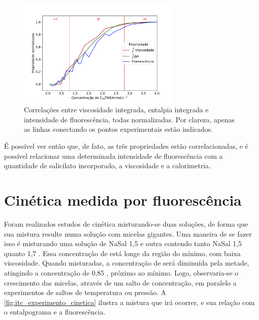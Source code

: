 	\begin{figure}[h]
		\centering
		\includegraphics[width=0.7\textwidth]{imagens/fluor/correlacoes_propriedades_zoom}
		\caption{Correlações entre viscosidade integrada, entalpia integrada e intensidade de fluorescência, todas normalizadas. Por clareza, apenas as linhas conectando os pontos experimentais estão indicados.}
		\label{fig:correlacoes_propriedades_zoom}
	\end{figure}
	
	É possível ver então que, de fato, as três propriedades estão correlacionadas, e é possível relacionar uma determinada intensidade de fluorescência com a quantidade de salicilato incorporado, a viscosidade e a calorimetria.

	\FloatBarrier	
	
	\section{Cinética medida por fluorescência} 
	
	Foram realizados estudos de cinética misturando-se duas soluções, de forma que sua mistura resulte numa solução com micelas gigantes. Uma maneira de se fazer isso é misturando uma solução de NaSal 1,5 \mM{} e outra contendo tanto NaSal 1,5 \mM{} quanto \TTAB{} 1,7 \mM. Essa concentração de \TTAB{} está longe da região do mínimo, com baixa viscosidade. Quando misturadas, a concentração de \TTAB{} será diminuída pela metade, atingindo a concentração de 0,85 \mM{}, próximo ao mínimo. Logo, observaria-se o crescimento das micelas, através de um salto de concentração, em paralelo a experimentos de saltos de temperatura ou pressão.\cite{Hoffmann2012a} A \autoref{fig:itc_experimento_cinetica} ilustra a mistura que irá ocorrer, e sua relação com o entalpograma e a fluorescência.
	
